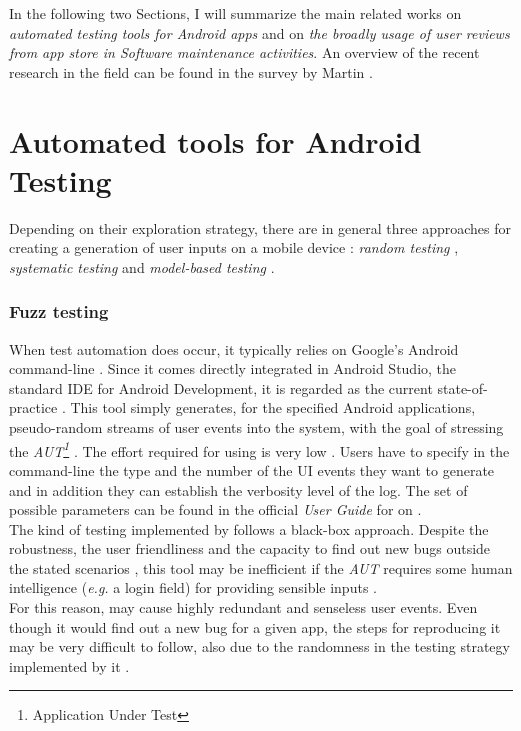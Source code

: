 \label{chapter:related}
In the following two Sections, I will summarize the main related works on \textit{automated testing tools for Android apps} and on \textit{the broadly usage of user reviews from app store in Software maintenance activities}. 
An overview of the recent research in the field can be found in the survey by Martin \etal \cite{Martin:tse2017}. 
\section{Automated tools for Android Testing}
\label{sec:tools}
Depending on their exploration strategy, there are in general three approaches for creating a generation of user inputs on a mobile device \cite{areWeThereYet}: \textit{random testing} \cite{dynodroid, monkey}, \textit{systematic testing} \cite{evodroid} and \textit{model-based testing} \cite{mobiguitar, swift, mining}. 
\subsubsection{Fuzz testing}
When test automation does occur, it typically relies on Google's Android \monkey command-line \cite{monkey}. Since it comes directly integrated in Android Studio, the standard IDE for Android Development, it is regarded as the current state-of-practice \cite{evodroid}.
This tool simply generates, for the specified Android applications, pseudo-random streams of user events into the system, with the goal of stressing the \textit{AUT\footnote{Application Under Test}} \cite{monkey}.  
The effort required for using \monkey is very low \cite{areWeThereYet}. Users have to specify in the command-line the type and the number of the UI events they want to generate and in addition they can establish the verbosity level of the \monkey log. 
The set of possible \monkey parameters can be found in the official \textit{User Guide} for \monkey on \cite{monkey}. \\
The kind of testing implemented by \monkey follows a black-box approach. 
Despite the robustness, the user friendliness \cite{areWeThereYet, dynodroid} and the capacity to find out new bugs outside the stated scenarios  \cite{monkey_2}, this tool may be inefficient if the \textit{AUT} requires some human intelligence (\textit{e.g.} a login field) for providing sensible inputs \cite{dynodroid}. \\
For this reason, \monkey may cause highly redundant and senseless user events. Even though it would find out a new bug for a given app, the steps for reproducing it may be very difficult to follow, also due to the randomness in the testing strategy implemented by it \cite{monkey_2}. 


